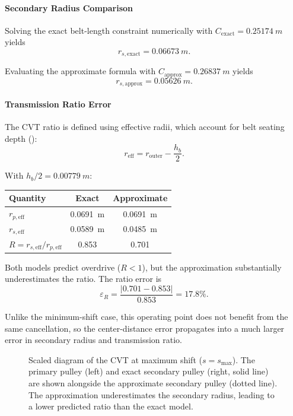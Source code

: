 \documentclass[11pt]{article}
\numberwithin{equation}{section}
\begin{document}
\paragraph{Secondary Radius Comparison}

Solving the exact belt-length constraint 
numerically with $C_{\mathrm{exact}} = \SI{0.25174}{m}$ yields
\[
r_{s,\mathrm{exact}} = \SI{0.06673}{m}.
\]

Evaluating the approximate formula  with
$C_{\mathrm{approx}} = \SI{0.26837}{m}$ yields
\[
r_{s,\mathrm{approx}} = \SI{0.05626}{m}.
\]

\paragraph{Transmission Ratio Error}

The CVT ratio is defined using effective radii, which account for
belt seating depth ():
\[
r_{\text{eff}} = r_{\text{outer}} - \frac{h_b}{2}.
\]

With $h_b/2 = \SI{0.00779}{m}$:

\begin{center}
\begin{tabular}{lcc}
\midrule[\heavyrulewidth]
Quantity & \textbf{Exact} & \textbf{Approximate} \\
\midrule
$r_{p,\text{eff}}$ & \SI{0.0691}{m} & \SI{0.0691}{m} \\
$r_{s,\text{eff}}$ & \SI{0.0589}{m} & \SI{0.0485}{m} \\
$R = r_{s,\text{eff}}/r_{p,\text{eff}}$ & 0.853 & 0.701 \\
\bottomrule
\end{tabular}
\end{center}

Both models predict overdrive ($R < 1$), but the approximation
substantially underestimates the ratio. The ratio error is
\[
\varepsilon_R = \frac{|0.701 - 0.853|}{0.853} = 17.8\%.
\]

Unlike the minimum-shift case, this operating point does not benefit from
the same cancellation, so the center-distance error propagates into a much
larger error in secondary radius and transmission ratio.

\begin{figure}[H]
\centering
\caption{Scaled diagram of the CVT at maximum shift ($s = s_{\max}$).
The primary pulley (left) and exact secondary pulley (right, solid line)
are shown alongside the approximate secondary pulley (dotted line).
The approximation underestimates the secondary radius,
leading to a lower predicted ratio than the exact model.}
\label{fig:approx_max_shift}
\end{figure}
\end{document}
